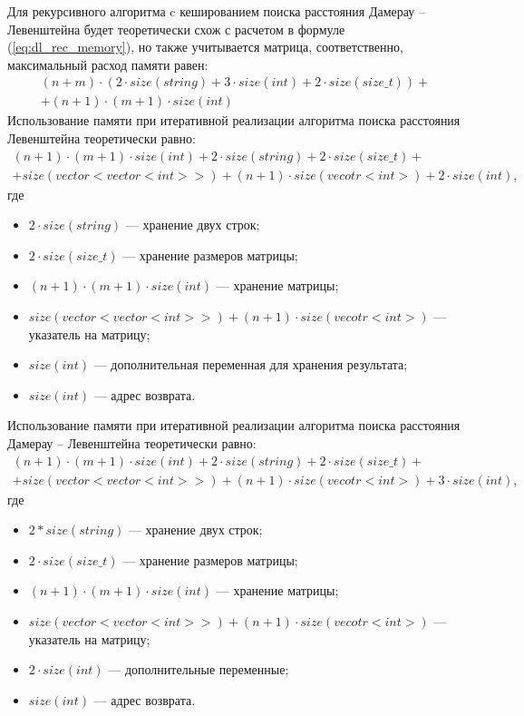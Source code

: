 Для рекурсивного алгоритма c кешированием поиска расстояния Дамерау -- Левенштейна будет теоретически схож с расчетом в формуле (\ref{eq:dl_rec_memory}), но также учитывается матрица, соответственно, максимальный расход памяти равен:
\begin{equation}
	\label{eq:dl_hash_memory}
	\begin{aligned}
		(n + m) \cdot (2 \cdot size(string) + 3 \cdot size(int) + 2 \cdot size(size\_t)) + \\
		+ (n + 1) \cdot (m + 1) \cdot size(int)
	\end{aligned}
\end{equation}
Использование памяти при итеративной реализации алгоритма поиска расстояния Левенштейна теоретически равно:
\begin{equation}
	\label{eq:lev_mtr_memory}
	\begin{aligned}
		(n + 1) \cdot (m + 1) \cdot size(int) + 2 \cdot size(string) + 2 \cdot size(size\_t) + \\
		+ size(vector<vector<int>>) + (n + 1) \cdot size(vecotr<int>) + 2 \cdot size(int),
	\end{aligned}
\end{equation}
где 
\begin{itemize}
	\item $2 \cdot size(string)$ --- хранение двух строк;
	\item $2 \cdot size(size\_t)$ --- хранение размеров матрицы;
	\item $(n + 1) \cdot (m + 1) \cdot size(int)$ --- хранение матрицы;
	\item $size(vector<vector<int>>) + (n + 1) \cdot size(vecotr<int>)$ --- указатель на матрицу;
	\item $size(int)$ --- дополнительная переменная для хранения результата;
	\item $size(int)$ --- адрес возврата.
\end{itemize}

Использование памяти при итеративной реализации алгоритма поиска расстояния Дамерау -- Левенштейна теоретически равно:
\begin{equation}
	\label{eq:dl_mtr_memory}
	\begin{aligned}
		(n + 1) \cdot (m + 1) \cdot size(int) + 2 \cdot size(string) + 2 \cdot size(size\_t) + \\
		+ size(vector<vector<int>>) + (n + 1) \cdot size(vecotr<int>) + 3 \cdot size(int),
	\end{aligned}
\end{equation}
где 
\begin{itemize}
	\item $2 * size(string)$ --- хранение двух строк;
	\item $2 \cdot size(size\_t)$ --- хранение размеров матрицы;
	\item $(n + 1) \cdot (m + 1) \cdot size(int)$ --- хранение матрицы;
	\item $size(vector<vector<int>>) + (n + 1) \cdot size(vecotr<int>)$ --- указатель на матрицу;
	\item $2 \cdot size(int)$ --- дополнительные переменные;
	\item $size(int)$ --- адрес возврата.
\end{itemize}

